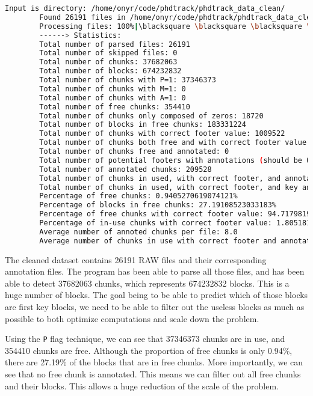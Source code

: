     \begin{lstlisting}[language=bash, caption={Printing cleaned dataset chunk parsing global statistics.}]
        Input is directory: /home/onyr/code/phdtrack/phdtrack_data_clean/
        Found 26191 files in /home/onyr/code/phdtrack/phdtrack_data_clean/.
        Processing files: 100%|\blacksquare \blacksquare \blacksquare \blacksquare \blacksquare | 26191/26191 [12:11<00:00, 35.81it/s, file=7091-1650972335]
        ------> Statistics:
        Total number of parsed files: 26191
        Total number of skipped files: 0
        Total number of chunks: 37682063
        Total number of blocks: 674232832
        Total number of chunks with P=1: 37346373
        Total number of chunks with M=1: 0
        Total number of chunks with A=1: 0
        Total number of free chunks: 354410
        Total number of chunks only composed of zeros: 18720
        Total number of blocks in free chunks: 183331224
        Total number of chunks with correct footer value: 1009522
        Total number of chunks both free and with correct footer value: 335690
        Total number of chunks free and annotated: 0
        Total number of potential footers with annotations (should be 0): 0
        Total number of annotated chunks: 209528
        Total number of chunks in used, with correct footer, and annotated: 7668
        Total number of chunks in used, with correct footer, and key annotated: 7668
        Percentage of free chunks: 0.9405270619074121%
        Percentage of blocks in free chunks: 27.19108523033183%
        Percentage of free chunks with correct footer value: 94.71798199825061%
        Percentage of in-use chunks with correct footer value: 1.8051818044922352%
        Average number of annoted chunks per file: 8.0
        Average number of chunks in use with correct footer and annotated per file: 0.2927723263716544
    \end{lstlisting}

    The cleaned dataset contains 26191 RAW files and their corresponding annotation files. The program has been able to parse all those files, and has been able to detect 37682063 chunks, which represents 674232832 blocks. This is a huge number of blocks. The goal being to be able to predict which of those blocks are first key blocks, we need to be able to filter out the useless blocks as much as possible to both optimize computations and scale down the problem. 

    Using the \texttt{P} flag technique, we can see that 37346373 chunks are in use, and 354410 chunks are free. Although the proportion of free chunks is only 0.94\%, there are 27.19\% of the blocks that are in free chunks. More importantly, we can see that no free chunk is annotated. This means we can filter out all free chunks and their blocks. This allows a huge reduction of the scale of the problem. 
    
